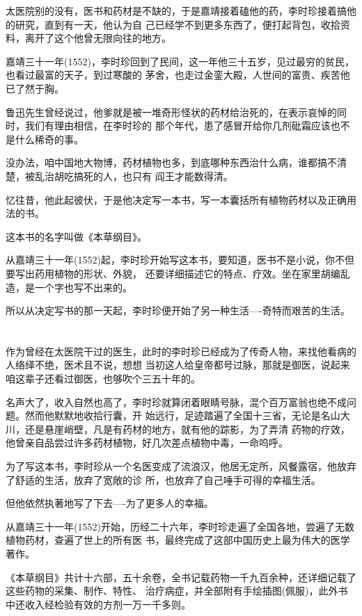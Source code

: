 \documentclass[11pt,a4paper,onecolumn]{article}
\begin{document}
太医院别的没有，医书和药材是不缺的，于是嘉靖接着磕他的药，李时珍接着搞他的研究，直到有一天，他认为自
己已经学不到更多东西了，便打起背包，收拾资料，离开了这个他曾无限向往的地方。

嘉靖三十一年(1552)，李时珍回到了民间，这一年他三十五岁，见过最穷的贫民，也看过最富的天子，到过寒酸的
茅舍，也走过金銮大殿，人世间的富贵、疾苦他已了然于胸。

鲁迅先生曾经说过，他爹就是被一堆奇形怪状的药材给治死的，在表示哀悼的同时，我们有理由相信，在李时珍的
那个年代，患了感冒开给你几剂砒霜应该也不是什么稀奇的事。

没办法，咱中国地大物博，药材植物也多，到底哪种东西治什么病，谁都搞不清楚，被乱治胡吃搞死的人，也只有
阎王才能数得清。

忆往昔，他此起彼伏，于是他决定写一本书，写一本囊括所有植物药材以及正确用法的书。

这本书的名字叫做《本草纲目》。

从嘉靖三十一年(1552)起，李时珍开始写这本书，要知道，医书不是小说，你不但要写出药用植物的形状、外貌，
还要详细描述它的特点、疗效。坐在家里胡编乱造，是一个字也写不出来的。

所以从决定写书的那一天起，李时珍便开始了另一种生活----奇特而艰苦的生活。

\section[\thesection]{}

作为曾经在太医院干过的医生，此时的李时珍已经成为了传奇人物，来找他看病的人络绎不绝，医术且不说，想想
当初这人给皇帝都号过脉，那就是御医，说起来咱这辈子还看过御医，也够吹个三五十年的。

名声大了，收入自然也高了，李时珍就算闭着眼睛号脉，混个百万富翁也绝不成问题。然而他默默地收拾行囊，开
始远行，足迹踏遍了全国十三省，无论是名山大川，还是悬崖峭壁，凡是有药材的地方，就有他的踪影，为了弄清
药物的疗效，他曾亲自品尝过许多药材植物，好几次差点植物中毒，一命呜呼。

为了写这本书，李时珍从一个名医变成了流浪汉，他居无定所，风餐露宿，他放弃了舒适的生活，放弃了宽敞的诊
所，也放弃了自己唾手可得的幸福生活。

但他依然执著地写了下去----为了更多人的幸福。

从嘉靖三十一年(1552)开始，历经二十六年，李时珍走遍了全国各地，尝遍了无数植物药材，查遍了世上的所有医
书，最终完成了这部中国历史上最为伟大的医学著作。

《本草纲目》共计十六部，五十余卷，全书记载药物一千九百余种，还详细记载了这些药物的采集、制作、特性、
治疗病症，并全部附有手绘插图(佩服)，此外书中还收入经检验有效的方剂一万一千多则。
\end{document}
